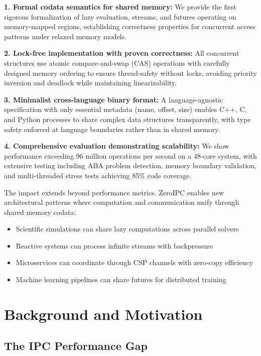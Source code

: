 \documentclass[letterpaper,twocolumn,10pt]{article}
\newcommand{\projectname}{ZeroIPC}
\begin{document}
\textbf{1. Formal codata semantics for shared memory:} We provide the first rigorous formalization of lazy evaluation, streams, and futures operating on memory-mapped regions, establishing correctness properties for concurrent access patterns under relaxed memory models.

\textbf{2. Lock-free implementation with proven correctness:} All concurrent structures use atomic compare-and-swap (CAS) operations with carefully designed memory ordering to ensure thread-safety without locks, avoiding priority inversion and deadlock while maintaining linearizability.

\textbf{3. Minimalist cross-language binary format:} A language-agnostic specification with only essential metadata (name, offset, size) enables C++, C, and Python processes to share complex data structures transparently, with type safety enforced at language boundaries rather than in shared memory.

\textbf{4. Comprehensive evaluation demonstrating scalability:} We show performance exceeding 96 million operations per second on a 48-core system, with extensive testing including ABA problem detection, memory boundary validation, and multi-threaded stress tests achieving 85\% code coverage.

The impact extends beyond performance metrics. \projectname{} enables new architectural patterns where computation and communication unify through shared memory codata:

\begin{itemize}
\item Scientific simulations can share lazy computations across parallel solvers
\item Reactive systems can process infinite streams with backpressure
\item Microservices can coordinate through CSP channels with zero-copy efficiency
\item Machine learning pipelines can share futures for distributed training
\end{itemize}

\section{Background and Motivation}

\subsection{The IPC Performance Gap}
\end{document}
